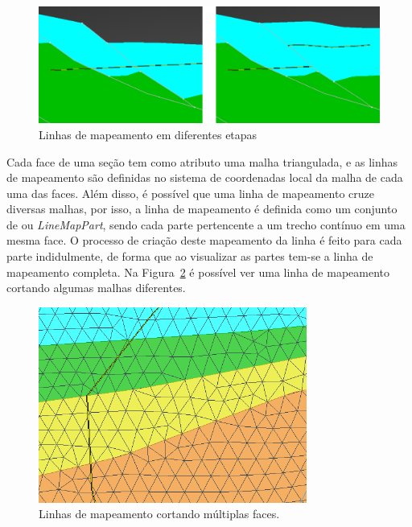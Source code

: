 \begin{figure} [h]
  \begin{center}
    \includegraphics[width=420pt]{images/fig-linemap-history}
    \caption{Linhas de mapeamento em diferentes etapas}\label{fig-linemap-history}
  \end{center}
\end{figure}


Cada face de uma seção tem como atributo uma malha triangulada, e as linhas de mapeamento são definidas no sistema de coordenadas local da malha de cada uma das faces. Além disso, é possível que uma linha de mapeamento cruze diversas malhas, por isso, a linha de mapeamento é definida como um conjunto de  ou \textit{LineMapPart}, sendo cada parte pertencente a um trecho contínuo em uma mesma face. O processo de criação deste mapeamento da linha é feito para cada parte indidulmente, de forma que ao visualizar as partes tem-se a linha de mapeamento completa. Na Figura~\ref{fig-linemap-malhas} é possível ver uma linha de mapeamento cortando algumas malhas diferentes.

\begin{figure} [h]
  \begin{center}
    \includegraphics[width=250pt]{images/fig-linhas-de-mapeamento-malhas}
    \caption{Linhas de mapeamento cortando múltiplas faces.}\label{fig-linemap-malhas}
  \end{center}
\end{figure}

